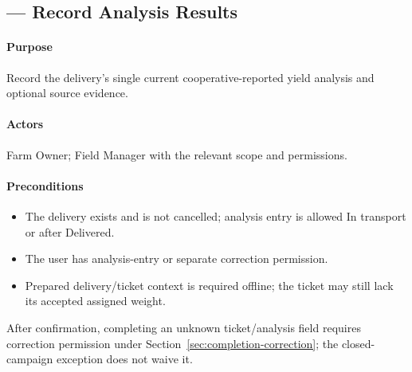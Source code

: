 \subsection{ --- Record Analysis Results}\label{uc:17}

\paragraph{Purpose}
Record the delivery's single current cooperative-reported yield analysis and optional source evidence.

\paragraph{Actors}
Farm Owner; Field Manager with the relevant scope and permissions.

\paragraph{Preconditions}
\begin{itemize}
\item The delivery exists and is not cancelled; analysis entry is allowed In transport or after Delivered.
\item The user has analysis-entry or separate correction permission.
\item Prepared delivery/ticket context is required offline; the ticket may still lack its accepted assigned weight.
\end{itemize}

After confirmation, completing an unknown ticket/analysis field requires correction permission under Section~\ref{sec:completion-correction}; the closed-campaign exception does not waive it.

